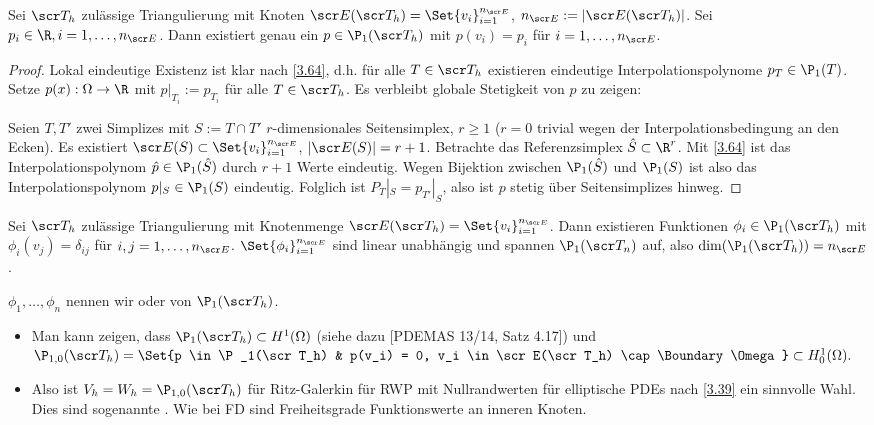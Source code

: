 \begin{st} \label{3.65}
	Sei $\scr T_h$ zulässige Triangulierung mit Knoten $\scr E(\scr T_h) = \Set{v_i}_{i=1}^{n_{\scr E}}$, $n_{\scr E} := |\scr E(\scr T_h)|$.
	Sei $p_i \in \R, i = 1, \dotsc, n_{\scr E}$.
	Dann existiert genau ein $p \in \P_1(\scr T_h)$ mit $p(v_i) = p_i$ für $i = 1, \dotsc, n_{\scr E}$.
	\begin{proof}
		Lokal eindeutige Existenz ist klar nach \ref{3.64}, d.h. für alle $T \in \scr T_h$ existieren eindeutige Interpolationspolynome $p_T \in \P_1(T)$.
		Setze $p(x) : \Omega \to \R$ mit $p|_{T_i} := p_{T_i}$ für alle $T \in \scr T_h$.
		Es verbleibt globale Stetigkeit von $p$ zu zeigen:

		Seien $T, T'$ zwei Simplizes mit $S := T \cap T'$ $r$-dimensionales Seitensimplex, $r \ge 1$ ($r = 0$ trivial wegen der Interpolationsbedingung an den Ecken).
		Es existiert $\scr E(S) \subset \Set{v_i}_{i=1}^{n_{\scr E}}$, $|\scr E(S)| = r + 1$.
		Betrachte das Referenzsimplex $\hat S \subset \R^r$.
		Mit \ref{3.64} ist das Interpolationspolynom $\hat p \in \P_1(\hat S)$ durch $r + 1$ Werte eindeutig.
		Wegen Bijektion zwischen $\P_1(\hat S)$ und $\P_1(S)$ ist also das Interpolationspolynom $p|_S \in \P_1(S)$ eindeutig.
		Folglich ist $P_T|_S = p_{T'}|_S$, also ist $p$ stetig über Seitensimplizes hinweg.
	\end{proof}
\end{st}

\begin{df}[Lagrange-Basis, $k = 1$] \label{3.66}
	Sei $\scr T_h$ zulässige Triangulierung mit Knotenmenge $\scr E(\scr T_h) = \Set{v_i}_{i=1}^{n_{\scr E}}$.
	Dann existieren Funktionen $\phi_i \in \P_1(\scr T_h)$ mit $\phi_i(v_j) = \delta_{ij}$ für $i, j = 1, \dotsc, n_{\scr E}$.
	$\Set{\phi_i}_{i=1}^{n_{\scr E}}$ sind linear unabhängig und spannen $\P_1(\scr T_n)$ auf, also $\dim(\P_1(\scr T_h)) = n_{\scr E}$.

	$\phi_1, \dotsc, \phi_n$ nennen wir  oder  von $\P_1(\scr T_h)$.
\end{df}

\begin{note}
	\begin{itemize}
		\item
			Man kann zeigen, dass $\P_1(\scr T_h) \subset H^1(\Omega)$ (siehe dazu [PDEMAS 13/14, Satz 4.17]) und
			\begin{math}
				\P_{1,0} (\scr T_h) = \Set{p \in \P_1(\scr T_h) & p(v_i) = 0, v_i \in \scr E(\scr T_h) \cap \Boundary \Omega }
				\subset H_0^1(\Omega).
			\end{math}
		\item
			Also ist $V_h = W_h = \P_{1,0}(\scr T_h)$ für Ritz-Galerkin für RWP mit Nullrandwerten für elliptische PDEs nach \ref{3.39} ein sinnvolle Wahl.
			Dies sind sogenannte .
			Wie bei FD sind Freiheitsgrade Funktionswerte an inneren Knoten.
	\end{itemize}
\end{note}

